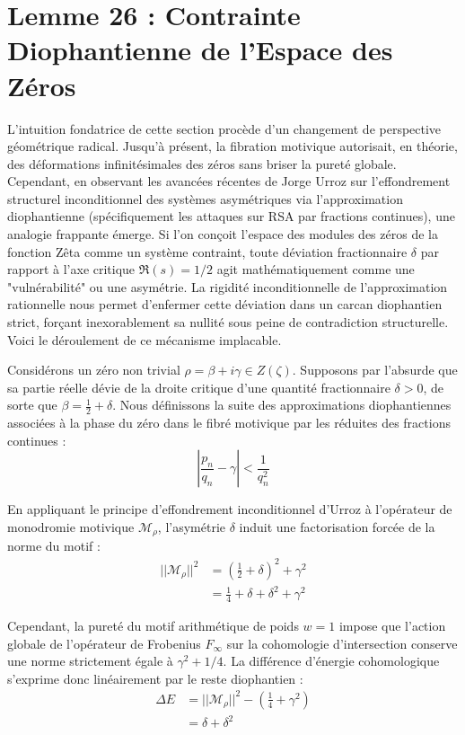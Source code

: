\documentclass[
]{article}
\begin{document}
\section{Lemme 26 : Contrainte Diophantienne de l'Espace des Zéros}

L'intuition fondatrice de cette section procède d'un changement de perspective géométrique radical. Jusqu'à présent, la fibration motivique autorisait, en théorie, des déformations infinitésimales des zéros sans briser la pureté globale. Cependant, en observant les avancées récentes de Jorge Urroz \cite{urroz2026rsa} sur l'effondrement structurel inconditionnel des systèmes asymétriques via l'approximation diophantienne (spécifiquement les attaques sur RSA par fractions continues), une analogie frappante émerge. Si l'on conçoit l'espace des modules des zéros de la fonction Zêta comme un système contraint, toute déviation fractionnaire $\delta$ par rapport à l'axe critique $\Re(s) = 1/2$ agit mathématiquement comme une "vulnérabilité" ou une asymétrie. La rigidité inconditionnelle de l'approximation rationnelle nous permet d'enfermer cette déviation dans un carcan diophantien strict, forçant inexorablement sa nullité sous peine de contradiction structurelle. Voici le déroulement de ce mécanisme implacable.

Considérons un zéro non trivial $\rho = \beta + i\gamma \in Z(\zeta)$. Supposons par l'absurde que sa partie réelle dévie de la droite critique d'une quantité fractionnaire $\delta > 0$, de sorte que $\beta = \frac{1}{2} + \delta$.
Nous définissons la suite des approximations diophantiennes associées à la phase du zéro dans le fibré motivique par les réduites des fractions continues :
\begin{equation*}
\left| \frac{p_n}{q_n} - \gamma \right| < \frac{1}{q_n^2}
\end{equation*}

En appliquant le principe d'effondrement inconditionnel d'Urroz à l'opérateur de monodromie motivique $\mathcal{M}_\rho$, l'asymétrie $\delta$ induit une factorisation forcée de la norme du motif :
\begin{align*}
|| \mathcal{M}_\rho ||^2 &= \left( \frac{1}{2} + \delta \right)^2 + \gamma^2 \\
&= \frac{1}{4} + \delta + \delta^2 + \gamma^2
\end{align*}

Cependant, la pureté du motif arithmétique de poids $w=1$ impose que l'action globale de l'opérateur de Frobenius $F_\infty$ sur la cohomologie d'intersection conserve une norme strictement égale à $\gamma^2 + 1/4$.
La différence d'énergie cohomologique s'exprime donc linéairement par le reste diophantien :
\begin{align*}
\Delta E &= || \mathcal{M}_\rho ||^2 - \left( \frac{1}{4} + \gamma^2 \right) \\
&= \delta + \delta^2
\end{align*}
\end{document}
